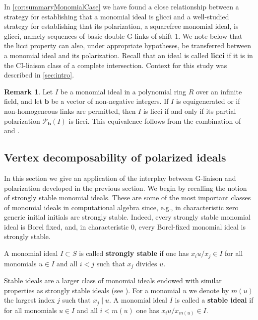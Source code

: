 \documentclass[12pt, reqno]{amsart}
\numberwithin{equation}{section}
\newtheorem{Main Conjecture}[theorem]{Main Conjecture}
\theoremstyle{definition}
\newtheorem{remark}[theorem]{Remark}
\theoremstyle{plain}
\renewcommand{\P}{\mathcal{P}}
\newcommand{\bb}{\mathbf{b}}
\begin{document}
In \cref{cor:summaryMonomialCase} we have found a close relationship between a strategy for establishing that a monomial ideal is glicci and a well-studied strategy for establishing that its polarization, a squarefree monomial ideal, is glicci, namely sequences of basic double G-links of shift $1$. We note below that the licci property can also, under appropriate hypotheses, be transferred between a monomial ideal and its polarization. Recall that an ideal is called \textbf{licci} if it is in the CI-liaison class of a complete intersection.  Context for this study was described in \cref{sec:intro}.

\begin{remark}\label{rem: licci}
    Let $I$ be a monomial ideal in a polynomial ring $R$ over an infinite field, and let $\bb$ be a vector of non-negative integers. If $I$ is equigenerated or if non-homogeneous links are permitted, then $I$ is licci if and only if its partial polarization $\P_{\bb}(I)$ is licci.  This equivalence follows from the combination of \cite[Proposition 3]{HU07} and \cite[Theorem 2.12]{HU2}.
\end{remark}




\subsection{Vertex decomposability of polarized  ideals}

In this section we give an application of the interplay between G-liaison and polarization 
developed in the previous section. 
We begin by recalling the notion of strongly stable monomial ideals.  These are some of the most important classes of monomial ideals in computational algebra since, e.g., in characteristic zero generic initial initials are strongly stable.  Indeed, every strongly stable monomial ideal is Borel fixed, and, in characteristic $0$, every Borel-fixed monomial ideal is strongly stable.

    A monomial ideal $I \subset S$ is called {\bf strongly stable} if one has $x_iu/x_j \in I$ for all monomials $u \in I$ and all $i < j$ such that $x_j$ divides $u$.

Stable ideals are a larger class of monomial ideals endowed with similar properties as strongly stable ideals (see \cite{EK}).  For a monomial $u$ we denote by $m(u)$ the largest index $j$ such that $x_j\mid u$. A monomial ideal $I$ is called a {\bf stable ideal} if for all monomials $u \in I$ and all $i < m(u)$ one has $x_iu/x_{m(u)} \in I$.
\end{document}
